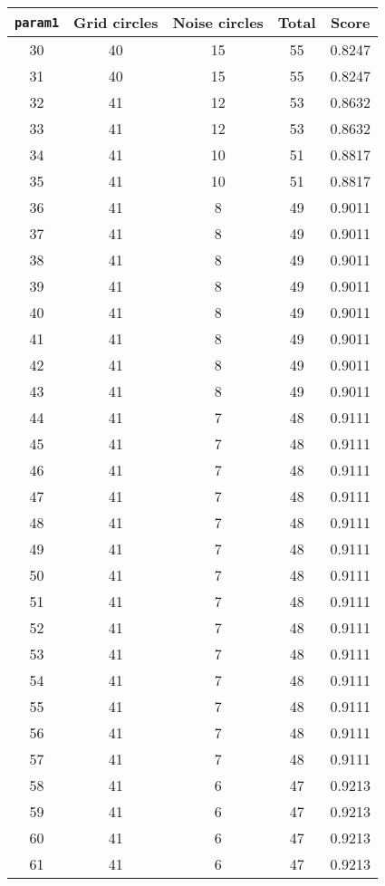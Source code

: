 \documentclass[letterpaper, 12pt]{article}
\begin{document}
\begin{longtable}{|c|c|c|c|c|}
\hline
\textbf{\texttt{param1}} & \textbf{Grid circles} & \textbf{Noise circles} & \textbf{Total} & \textbf{Score} \\
\hline
30 & 40 & 15 & 55 & 0.8247 \\
\hline
31 & 40 & 15 & 55 & 0.8247 \\
\hline
32 & 41 & 12 & 53 & 0.8632 \\
\hline
33 & 41 & 12 & 53 & 0.8632 \\
\hline
34 & 41 & 10 & 51 & 0.8817 \\
\hline
35 & 41 & 10 & 51 & 0.8817 \\
\hline
36 & 41 & 8 & 49 & 0.9011 \\
\hline
37 & 41 & 8 & 49 & 0.9011 \\
\hline
38 & 41 & 8 & 49 & 0.9011 \\
\hline
39 & 41 & 8 & 49 & 0.9011 \\
\hline
40 & 41 & 8 & 49 & 0.9011 \\
\hline
41 & 41 & 8 & 49 & 0.9011 \\
\hline
42 & 41 & 8 & 49 & 0.9011 \\
\hline
43 & 41 & 8 & 49 & 0.9011 \\
\hline
44 & 41 & 7 & 48 & 0.9111 \\
\hline
45 & 41 & 7 & 48 & 0.9111 \\
\hline
46 & 41 & 7 & 48 & 0.9111 \\
\hline
47 & 41 & 7 & 48 & 0.9111 \\
\hline
48 & 41 & 7 & 48 & 0.9111 \\
\hline
49 & 41 & 7 & 48 & 0.9111 \\
\hline
50 & 41 & 7 & 48 & 0.9111 \\
\hline
51 & 41 & 7 & 48 & 0.9111 \\
\hline
52 & 41 & 7 & 48 & 0.9111 \\
\hline
53 & 41 & 7 & 48 & 0.9111 \\
\hline
54 & 41 & 7 & 48 & 0.9111 \\
\hline
55 & 41 & 7 & 48 & 0.9111 \\
\hline
56 & 41 & 7 & 48 & 0.9111 \\
\hline
57 & 41 & 7 & 48 & 0.9111 \\
\hline
58 & 41 & 6 & 47 & 0.9213 \\
\hline
59 & 41 & 6 & 47 & 0.9213 \\
\hline
60 & 41 & 6 & 47 & 0.9213 \\
\hline
61 & 41 & 6 & 47 & 0.9213 \\

\end{longtable}
\end{document}
